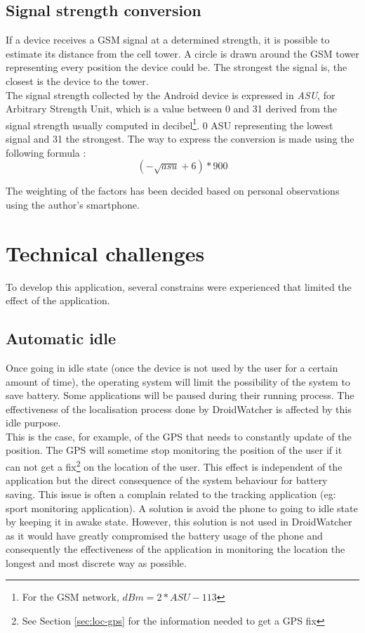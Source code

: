 
\subsection{Signal strength conversion}

If a device receives a GSM signal at a determined strength, it is possible to estimate its distance from the cell tower.
A circle is drawn around the GSM tower representing every position the device could be.
The strongest the signal is, the closest is the device to the tower.\\

The signal strength collected by the Android device is expressed in \emph{ASU}, for Arbitrary Strength Unit, which is a value between 0 and 31 derived from the signal strength usually computed in decibel\footnote{For the GSM network, $dBm = 2 * ASU - 113$}.
0 ASU representing the lowest signal and 31 the strongest.
The way to express the conversion is made using the following formula :\\

\[
 (-\sqrt{asu}+6)*900
\]

The weighting of the factors has been decided based on personal observations using the author's smartphone.

\section{Technical challenges}

To develop this application, several constrains were experienced that limited the effect of the application.

\subsection{Automatic idle}

Once going in idle state (once the device is not used by the user for a certain amount of time), the operating system will limit the possibility of the system to save battery.
Some applications will be paused during their running process.
The effectiveness of the localisation process done by DroidWatcher is affected by this idle purpose.\\

This is the case, for example, of the GPS that needs to constantly update of the position.
The GPS will sometime stop monitoring the position of the user if it can not get a fix\footnote{See Section \ref{sec:loc-gps} for the information needed to get a GPS fix} on the location of the user.
This effect is independent of the application but the direct consequence of the system behaviour for battery saving. 
This issue is often a complain related to the tracking application (eg: sport monitoring application).
A solution is avoid the phone to going to idle state by keeping it in awake state.
However, this solution is not used in DroidWatcher as it would have greatly compromised the battery usage of the phone and consequently the effectiveness of the application in monitoring the location the longest and most discrete way as possible.

